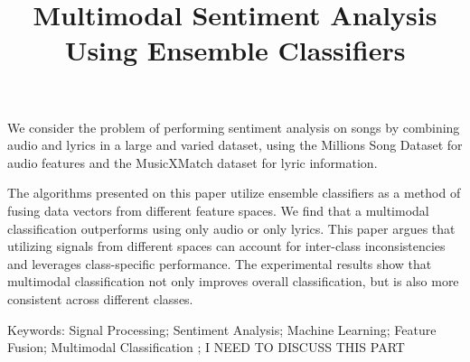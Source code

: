 \title{Multimodal Sentiment Analysis Using Ensemble Classifiers}

We consider the problem of performing sentiment analysis on songs
 by combining audio and lyrics in a large and varied dataset, 
 using the Millions Song Dataset for audio features and the 
 MusicXMatch dataset for lyric information. 
 
 The algorithms presented on this paper utilize ensemble classifiers
  as a method of fusing data vectors from different feature spaces.  
  We find that a multimodal classification outperforms using only audio 
  or only lyrics. This paper argues that utilizing signals from different 
  spaces can account for inter-class inconsistencies and leverages
   class-specific performance. The experimental results show that 
   multimodal classification not only improves overall classification, 
   but is also more consistent across different classes. 
 


Keywords: Signal Processing; Sentiment Analysis; Machine Learning; 
Feature Fusion; Multimodal Classification ; I NEED TO DISCUSS THIS PART
